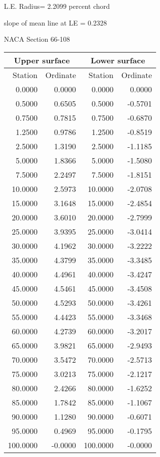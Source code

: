 \documentclass[11pt]{book}
\begin{document}
L.E. Radius=  2.2099 percent chord


 slope of mean line at LE =  0.2328
 \newpage
  \label{s66-108}
 \begin{Large}
 NACA Section 66-108
 \end{Large}
  
 \vspace{8mm}
 \begin{tabular}{|r|r|r|r|} \hline 
 \multicolumn{2}{|c|}{Upper surface} & \multicolumn{2}{|c|}{Lower surface} \\
 \hline
 Station & Ordinate & Station & Ordinate \\
 \hline
0.0000 & 0.0000 & 0.0000 & 0.0000 \\
0.5000 & 0.6505 & 0.5000 & -0.5701 \\
0.7500 & 0.7815 & 0.7500 & -0.6870 \\
1.2500 & 0.9786 & 1.2500 & -0.8519 \\
2.5000 & 1.3190 & 2.5000 & -1.1185 \\
5.0000 & 1.8366 & 5.0000 & -1.5080 \\
7.5000 & 2.2497 & 7.5000 & -1.8151 \\
10.0000 & 2.5973 & 10.0000 & -2.0708 \\
15.0000 & 3.1648 & 15.0000 & -2.4854 \\
20.0000 & 3.6010 & 20.0000 & -2.7999 \\
25.0000 & 3.9395 & 25.0000 & -3.0414 \\
30.0000 & 4.1962 & 30.0000 & -3.2222 \\
35.0000 & 4.3799 & 35.0000 & -3.3485 \\
40.0000 & 4.4961 & 40.0000 & -3.4247 \\
45.0000 & 4.5461 & 45.0000 & -3.4508 \\
50.0000 & 4.5293 & 50.0000 & -3.4261 \\
55.0000 & 4.4423 & 55.0000 & -3.3468 \\
60.0000 & 4.2739 & 60.0000 & -3.2017 \\
65.0000 & 3.9821 & 65.0000 & -2.9493 \\
70.0000 & 3.5472 & 70.0000 & -2.5713 \\
75.0000 & 3.0213 & 75.0000 & -2.1217 \\
80.0000 & 2.4266 & 80.0000 & -1.6252 \\
85.0000 & 1.7842 & 85.0000 & -1.1067 \\
90.0000 & 1.1280 & 90.0000 & -0.6071 \\
95.0000 & 0.4969 & 95.0000 & -0.1795 \\
100.0000 & -0.0000 & 100.0000 & -0.0000 \\
 \hline 
 \end{tabular}
\end{document}
